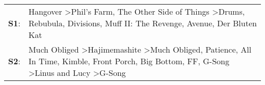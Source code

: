 \begin{supertabular}{p{0.03\textwidth}p{0.92\textwidth}}
 \textbf{S1}:  &                                                                                                                       Hangover\textsuperscript{} \textgreater \enspace Phil's Farm\textsuperscript{}, \enspace The Other Side of Things\textsuperscript{} \textgreater \enspace Drums\textsuperscript{}, \enspace Rebubula\textsuperscript{}, \enspace Divisions\textsuperscript{}, \enspace Muff II: The Revenge\textsuperscript{}, \enspace Avenue\textsuperscript{}, \enspace Der Bluten Kat\textsuperscript{}  \enspace  \\
 \textbf{S2}:  &  Much Obliged\textsuperscript{} \textgreater \enspace Hajimemashite\textsuperscript{} \textgreater \enspace Much Obliged\textsuperscript{}, \enspace Patience\textsuperscript{}, \enspace All In Time\textsuperscript{}, \enspace Kimble\textsuperscript{}, \enspace Front Porch\textsuperscript{}, \enspace Big Bottom\textsuperscript{}, \enspace FF\textsuperscript{}, \enspace G-Song\textsuperscript{} \textgreater \enspace Linus and Lucy\textsuperscript{} \textgreater \enspace G-Song\textsuperscript{}  \enspace  \\
\end{supertabular}
